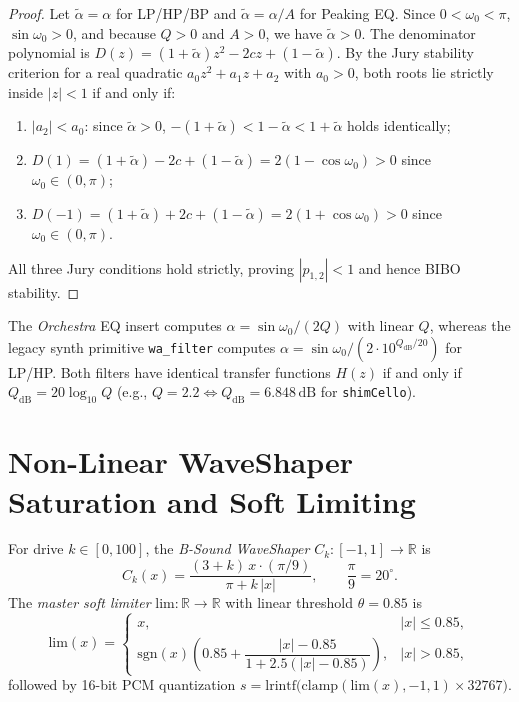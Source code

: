 \begin{proof}
Let $\tilde{\alpha} = \alpha$ for LP/HP/BP and $\tilde{\alpha} = \alpha/A$ for Peaking EQ. Since $0 < \omega_0 < \pi$, $\sin\omega_0 > 0$, and because $Q > 0$ and $A > 0$, we have $\tilde{\alpha} > 0$. The denominator polynomial is $D(z) = (1+\tilde{\alpha})z^2 - 2c z + (1-\tilde{\alpha})$. By the Jury stability criterion for a real quadratic $a_0 z^2 + a_1 z + a_2$ with $a_0 > 0$, both roots lie strictly inside $|z| < 1$ if and only if:
\begin{enumerate}[leftmargin=1.5em]
  \item $|a_2| < a_0$: since $\tilde{\alpha} > 0$, $-(1+\tilde{\alpha}) < 1 - \tilde{\alpha} < 1 + \tilde{\alpha}$ holds identically;
  \item $D(1) = (1+\tilde{\alpha}) - 2c + (1-\tilde{\alpha}) = 2(1 - \cos\omega_0) > 0$ since $\omega_0 \in (0, \pi)$;
  \item $D(-1) = (1+\tilde{\alpha}) + 2c + (1-\tilde{\alpha}) = 2(1 + \cos\omega_0) > 0$ since $\omega_0 \in (0, \pi)$.
\end{enumerate}
All three Jury conditions hold strictly, proving $|p_{1,2}| < 1$ and hence BIBO stability.
\end{proof}

\begin{proposition}
The \emph{Orchestra} EQ insert computes $\alpha = \sin\omega_0/(2Q)$ with linear $Q$, whereas the legacy synth primitive \texttt{wa\_filter} computes $\alpha = \sin\omega_0/(2\cdot 10^{Q_{\mathrm{dB}}/20})$ for LP/HP. Both filters have identical transfer functions $H(z)$ if and only if $Q_{\mathrm{dB}} = 20\log_{10} Q$ (e.g., $Q = 2.2 \iff Q_{\mathrm{dB}} = 6.848\,\text{dB}$ for \texttt{shimCello}).
\end{proposition}

\section{Non-Linear WaveShaper Saturation and Soft Limiting}

\begin{definition}
For drive $k \in [0, 100]$, the \emph{B-Sound WaveShaper} $C_k : [-1, 1] \to \mathbb{R}$ is
\begin{equation}
\label{eq:waveshaper}
C_k(x) = \frac{(3 + k)\,x\cdot (\pi / 9)}{\pi + k\,|x|}, \qquad \frac{\pi}{9} = 20^\circ.
\end{equation}
The \emph{master soft limiter} $\mathrm{lim} : \mathbb{R} \to \mathbb{R}$ with linear threshold $\theta = 0.85$ is
\begin{equation}
\label{eq:limiter}
\mathrm{lim}(x) =
\begin{cases}
x, & |x| \le 0.85, \\
\mathrm{sgn}(x)\!\left(0.85 + \dfrac{|x| - 0.85}{1 + 2.5(|x| - 0.85)}\right), & |x| > 0.85,
\end{cases}
\end{equation}
followed by 16-bit PCM quantization $s = \mathrm{lrintf}\big(\mathrm{clamp}(\mathrm{lim}(x), -1, 1)\times 32767\big)$.
\end{definition}

